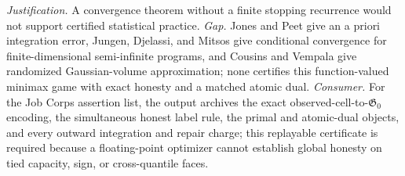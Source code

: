 \documentclass{article}
\begin{document}
\par\smallskip\noindent \textit{Justification.} A convergence theorem without a finite stopping recurrence would not support certified statistical practice. \textit{Gap.} Jones and Peet give an a priori integration error, Jungen, Djelassi, and Mitsos give conditional convergence for finite-dimensional semi-infinite programs, and Cousins and Vempala give randomized Gaussian-volume approximation; none certifies this function-valued minimax game with exact honesty and a matched atomic dual. \textit{Consumer.} For the Job Corps assertion list, the output archives the exact observed-cell-to-\(\mathfrak G_0\) encoding, the simultaneous honest label rule, the primal and atomic-dual objects, and every outward integration and repair charge; this replayable certificate is required because a floating-point optimizer cannot establish global honesty on tied capacity, sign, or cross-quantile faces.
\end{document}
